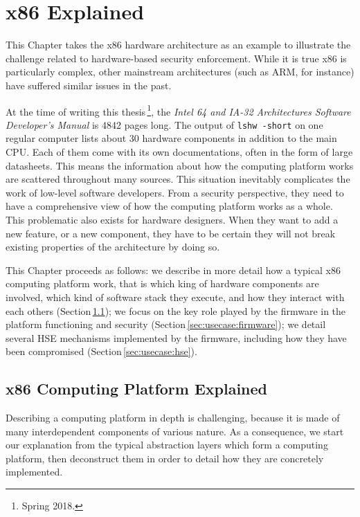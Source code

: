 \chapter{x86 Explained}
\label{chapter:usecase}

This Chapter takes the x86 hardware architecture as an example to illustrate the
challenge related to hardware-based security enforcement.
%
While it is true x86 is particularly complex, other mainstream architectures
(such as ARM, for instance) have suffered similar issues in the past.

At the time of writing this thesis\,\footnote{Spring 2018.}, the \emph{Intel 64
  and IA-32 Architectures Software Developer’s Manual} is 4842 pages long.
%
The output of \texttt{lshw -short} on one regular computer lists about 30
hardware components in addition to the main CPU.
%
Each of them come with its own documentations, often in the form of large
datasheets.
%
This means the information about how the computing platform works are scattered
throughout many sources.
%
This situation inevitably complicates the work of low-level software developers.
%
From a security perspective, they need to have a comprehensive view of how the
computing platform works as a whole.
%
This problematic also exists for hardware designers.
%
When they want to add a new feature, or a new component, they have to be certain
they will not break existing properties of the architecture by doing so.

This Chapter proceeds as follows:
%
we describe in more detail how a typical x86 computing platform work, that is
which king of hardware components are involved, which kind of software stack
they execute, and how they interact with each others
(Section\,\ref{sec:usecase:architecture});
%
we focus on the key role played by the firmware in the platform functioning and
security (Section\,\ref{sec:usecase:firmware});
%
we detail several HSE mechanisms implemented by the firmware, including how they
have been compromised (Section\,\ref{sec:usecase:hse}).

\section{x86 Computing Platform Explained}
\label{sec:usecase:architecture}

Describing a computing platform in depth is challenging, because it is made of
many interdependent components of various nature.
%
As a consequence, we start our explanation from the typical abstraction layers
which form a computing platform, then deconstruct them in order to detail how
they are concretely implemented.

